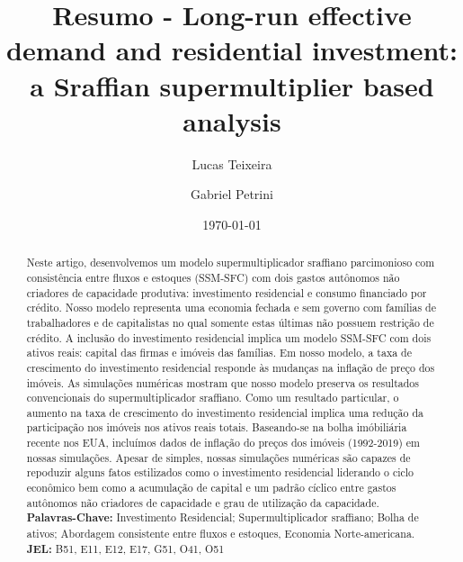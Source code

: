 \documentclass[12pt]{article}
\author[1]{Lucas Teixeira}
\affil[1]{Assistent Professor at University of Campinas (Brazil), Email: \url{lucastei@unicamp.br}} %
\author[2]{Gabriel Petrini}
\affil[2]{PhD Student at University of Campinas (Brazil), Email: \url{gpetrinidasilveira@gmail.com}} %
\date{\today}
\title{Resumo - Long-run effective demand and residential investment: a Sraffian supermultiplier based analysis}
\begin{document}
\maketitle
\renewcommand{\abstractname}{Resumo}
\begin{abstract}
Neste artigo, desenvolvemos um modelo supermultiplicador sraffiano parcimonioso com consistência entre fluxos e estoques (SSM-SFC) com dois gastos autônomos não criadores de capacidade produtiva: investimento residencial e consumo financiado por crédito.
Nosso modelo representa uma economia fechada e sem governo com famílias de trabalhadores e de capitalistas no qual somente estas últimas não possuem restrição de crédito.
A inclusão do investimento residencial implica um modelo SSM-SFC com dois ativos reais: capital das firmas e imóveis das famílias.
Em nosso modelo, a taxa de crescimento do investimento residencial responde às mudanças na inflação de preço dos imóveis.
As simulações numéricas mostram que nosso modelo preserva os resultados convencionais do supermultiplicador sraffiano.
Como um resultado particular, o aumento na taxa de crescimento do investimento residencial implica uma redução da participação nos imóveis nos ativos reais totais.
Baseando-se na bolha imóbiliária recente nos EUA, incluímos dados de inflação do preços dos imóveis (1992-2019) em nossas simulações.
Apesar de simples, nossas simulações numéricas são capazes de repoduzir alguns fatos estilizados como o investimento residencial liderando o ciclo econômico bem como a acumulação de capital e um padrão cíclico entre gastos autônomos não criadores de capacidade e grau de utilização da capacidade.\\

\noindent \textbf{Palavras-Chave:} Investimento Residencial; Supermultiplicador sraffiano; Bolha de ativos; Abordagem consistente entre fluxos e estoques, Economia Norte-americana.\\
\noindent \textbf{JEL:} B51, E11, E12, E17, G51, O41, O51
\end{abstract}
\end{document}
